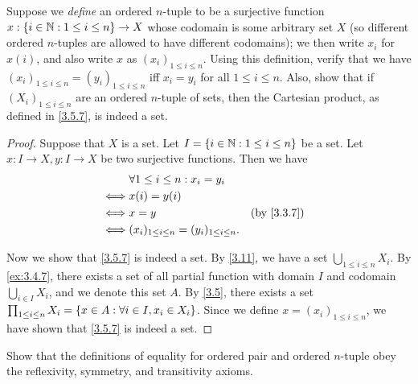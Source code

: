 \begin{ex}\label{ex:3.5.2}
	Suppose we \emph{define} an ordered \(n\)-tuple to be a surjective function \(x : \left\lbrace i \in \mathbb{N} : 1 \leq i \leq n\right\rbrace \to X\) whose codomain is some arbitrary set \(X\) (so different ordered \(n\)-tuples are allowed to have different codomains);
	we then write \(x_i\) for \(x(i)\), and also write \(x\) as \((x_i)_{1 \leq i \leq n}\).
	Using this definition, verify that we have \((x_i)_{1 \leq i \leq n} = (y_i)_{1 \leq i \leq n}\) iff \(x_i = y_i\) for all \(1 \leq i \leq n\).
	Also, show that if \((X_i)_{1 \leq i \leq n}\) are an ordered \(n\)-tuple of sets, then the Cartesian product, as defined in \cref{3.5.7}, is indeed a set.
\end{ex}

\begin{proof}
	Suppose that \(X\) is a set.
	Let \(I = \left\lbrace i \in \mathbb{N} : 1 \leq i \leq n\right\rbrace\) be a set.
	Let \(x : I \to X, y : I \to X\) be two surjective functions.
	Then we have
	\begin{align*}
		     & \forall 1 \leq i \leq n : x_i = y_i                                \\
		\iff & x(i) = y(i)                                                        \\
		\iff & x = y                                              &  & \by{3.3.7} \\
		\iff & (x_i)_{1 \leq i \leq n} = (y_i)_{1 \leq i \leq n}.
	\end{align*}

	Now we show that \cref{3.5.7} is indeed a set.
	By \cref{3.11}, we have a set \(\bigcup_{1 \leq i \leq n} X_i\).
	By \cref{ex:3.4.7}, there exists a set of all partial function with domain \(I\) and codomain \(\bigcup_{i \in I} X_i\), and we denote this set \(A\).
	By \cref{3.5}, there exists a set \(\prod_{1 \leq i \leq n} X_i = \left\lbrace x \in A : \forall i \in I, x_i \in X_i\right\rbrace\).
	Since we define \(x = (x_i)_{1 \leq i \leq n}\), we have shown that \cref{3.5.7} is indeed a set.
\end{proof}

\begin{ex}\label{ex:3.5.3}
	Show that the definitions of equality for ordered pair and ordered \(n\)-tuple obey the reflexivity, symmetry, and transitivity axioms.
\end{ex}

